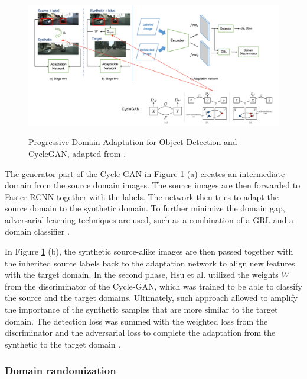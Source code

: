 \begin{figure}[htb]
	\begin{center}
		\includegraphics[width=16cm]{./GAN.png}
	\end{center}
	\caption{Progressive Domain Adaptation for Object Detection and CycleGAN, adapted from \cite{Hsu2019}.}
	\begin{center}
		\label{gan}
	\end{center}
\end{figure}

The generator part of the Cycle-GAN in Figure \ref{gan} (a) creates an intermediate domain from the source domain images. The source images are then forwarded to Faster-RCNN together with the labels. The network then tries to adapt the source domain to the synthetic domain. To further minimize the domain gap, adversarial learning techniques are used, such as a combination of a GRL and a domain classifier \cite{Hsu2019}.


In Figure \ref{gan} (b), the synthetic source-alike images are then passed together with the inherited source labels back to the adaptation network to align new features with the target domain. In the second phase, Hsu et al. utilized the weights $W$ from the discriminator of the Cycle-GAN, which was trained to be able to classify the source and the target domains. Ultimately, such approach allowed to amplify the importance of the synthetic samples that are more similar to the target domain. The detection loss was summed with the weighted loss from the discriminator and the adversarial loss to complete the adaptation from the synthetic to the target domain \cite{Hsu2019}. 
\FloatBarrier

\subsubsection{Domain randomization}

